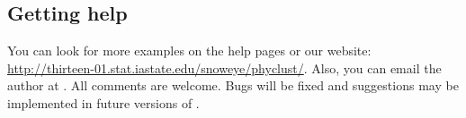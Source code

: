 \subsection[Getting help]{Getting help}
\label{sec:needhelp}

You can look for more examples on the help pages or our
website:
\url{http://thirteen-01.stat.iastate.edu/snoweye/phyclust/}.
Also, you can email the author at .
All comments are welcome.  Bugs will be fixed and
suggestions may be implemented in future versions of .

